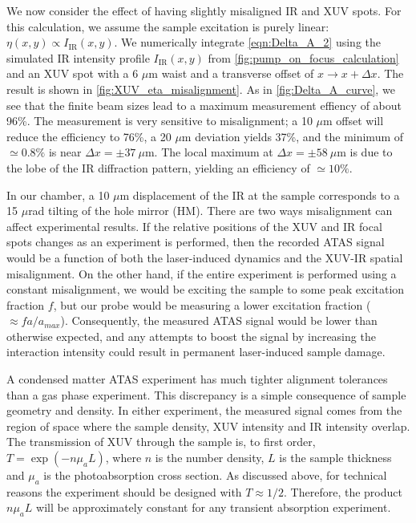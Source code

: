 We now consider the effect of having slightly misaligned IR and XUV spots. For this calculation, we assume the sample excitation is purely linear: $\eta(x,y) \propto I_{\textrm{IR}}(x,y)$. We numerically integrate \cref{eqn:Delta_A_2} using the simulated IR intensity profile $I_{\textrm{IR}}(x,y)$ from \cref{fig:pump_on_focus_calculation} and an XUV spot with a 6 $\mu$m waist and a transverse offset of $x \rightarrow x+\Delta x$. The result is shown in \cref{fig:XUV_eta_misalignment}. As in \cref{fig:Delta_A_curve}, we see that the finite beam sizes lead to a maximum measurement effiency of about 96\%. The measurement is very sensitive to misalignment; a 10 $\mu$m offset will reduce the efficiency to 76\%, a 20 $\mu$m deviation yields 37\%, and the minimum of $\simeq 0.8\%$ is near $\Delta x = \pm 37 \ \mu \textrm{m}$. The local maximum at $\Delta x = \pm 58 \ \mu \textrm{m}$ is due to the  lobe of the IR diffraction pattern, yielding an efficiency of $\simeq 10\%$.

In our chamber, a 10 $\mu$m displacement of the IR at the sample corresponds to a 15 $\mu$rad tilting of the hole mirror (HM). There are two ways misalignment can affect experimental results. If the relative positions of the XUV and IR focal spots changes as an experiment is performed, then the recorded ATAS signal would be a function of both the laser-induced dynamics and the XUV-IR spatial misalignment. On the other hand, if the entire experiment is performed using a constant misalignment, we would be exciting the sample to some peak excitation fraction $f$, but our probe would be measuring a lower excitation fraction ($\approx f a / a_{max}$). Consequently, the measured ATAS signal would be lower than otherwise expected, and any attempts to boost the signal by increasing the interaction intensity could result in permanent laser-induced sample damage.

A condensed matter ATAS experiment has much tighter alignment tolerances than a gas phase experiment. This discrepancy is a simple consequence of sample geometry and density. In either experiment, the measured signal comes from the region of space where the sample density, XUV intensity and IR intensity overlap. The transmission of XUV through the sample is, to first order, $T= \exp(- n \mu_a L)$, where $n$ is the number density, $L$ is the sample thickness and $\mu_a$ is the photoabsorption cross section. As discussed above, for technical reasons the experiment should be designed with $T \approx 1/2$. Therefore, the product $n \mu_a L$ will be approximately constant for any transient absorption experiment.

